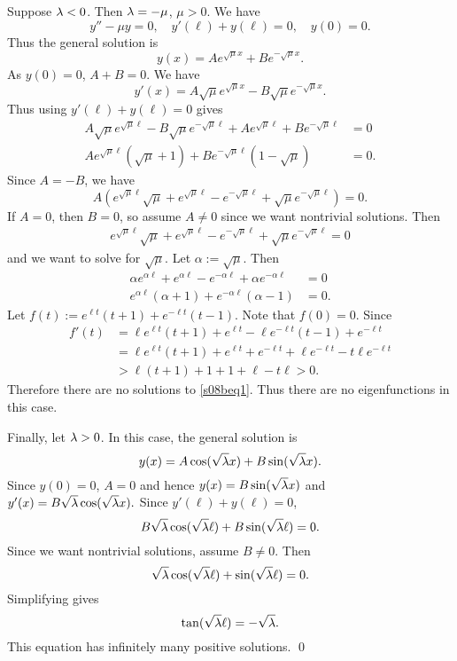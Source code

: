 Suppose $\lambda < 0$. Then $\lambda = -\mu$, $\mu > 0$.
We have
$$y'' - \mu y = 0, \quad y'(\ell) + y(\ell) = 0, \quad y(0) = 0.$$
Thus the general solution is
$$y(x) = Ae^{\sqrt{\mu}x} + Be^{-\sqrt{\mu}x}.$$
As $y(0) = 0$, $A + B = 0$. We have
$$y'(x) = A\sqrt{\mu}e^{\sqrt{\mu}x} - B\sqrt{\mu}e^{-\sqrt{\mu}x}.$$
Thus using $y'(\ell) + y(\ell) = 0$ gives
\begin{align*}
A\sqrt{\mu}e^{\sqrt{\mu}\ell} - B\sqrt{\mu}e^{-\sqrt{\mu}\ell} + Ae^{\sqrt{\mu}\ell} + Be^{-\sqrt{\mu}\ell} &= 0\\
Ae^{\sqrt{\mu}\ell}(\sqrt{\mu} + 1) + Be^{-\sqrt{\mu}\ell}(1 - \sqrt{\mu}) &= 0.
\end{align*}
Since $A = -B$, we have
$$A(e^{\sqrt{\mu}\ell}\sqrt{\mu} + e^{\sqrt{\mu}\ell} - e^{-\sqrt{\mu}\ell} + \sqrt{\mu}e^{-\sqrt{\mu}\ell}) = 0.$$
If $A = 0$, then $B = 0$, so assume $A \neq 0$ since we want nontrivial solutions. Then
\begin{align}\label{s08beq1}
e^{\sqrt{\mu}\ell}\sqrt{\mu} + e^{\sqrt{\mu}\ell} - e^{-\sqrt{\mu}\ell} + \sqrt{\mu}e^{-\sqrt{\mu}\ell} = 0
\end{align}
and we want to solve for $\sqrt{\mu}$. Let $\alpha := \sqrt{\mu}$. Then
\begin{align*}
\alpha e^{\alpha \ell} + e^{\alpha\ell} - e^{-\alpha \ell} + \alpha e^{-\alpha \ell} &= 0\\
e^{\alpha\ell}(\alpha + 1) + e^{-\alpha\ell}(\alpha - 1) &= 0.
\end{align*}
Let $f(t) := e^{\ell t}(t + 1) + e^{-\ell t}(t - 1)$. Note that $f(0) = 0$.
Since
\begin{align*}
f'(t) &= \ell e^{\ell t}(t + 1) + e^{\ell t} - \ell e^{-\ell t}(t - 1) + e^{-\ell t}\\
&= \ell e^{\ell t}(t + 1) + e^{\ell t} + e^{-\ell t} + \ell e^{-\ell t} - t\ell e^{-\ell t}\\
&> \ell(t + 1) + 1 + 1 + \ell - t\ell > 0.
\end{align*}
Therefore there are no solutions to \eqref{s08beq1}. Thus there are no eigenfunctions in this case.

Finally, let $\lambda > 0$. In this case, the general solution is
$$y(x) = A\cos(\sqrt{\lambda}x) + B\sin(\sqrt{\lambda}x).$$
Since $y(0) = 0$, $A = 0$ and hence $y(x) = B\sin(\sqrt{\lambda}x)$ and $y'(x) = B\sqrt{\lambda}\cos(\sqrt{\lambda}x).$
Since $y'(\ell) + y(\ell) = 0$,
$$B\sqrt{\lambda}\cos(\sqrt{\lambda}\ell) + B\sin(\sqrt{\lambda}\ell) = 0.$$
Since we want nontrivial solutions, assume $B \neq 0$. Then
$$\sqrt{\lambda}\cos(\sqrt{\lambda}\ell) + \sin(\sqrt{\lambda}\ell) = 0.$$
Simplifying gives
$$\tan(\sqrt{\lambda}\ell) = -\sqrt{\lambda}.$$
This equation has infinitely many positive solutions.
\hfill\qed

